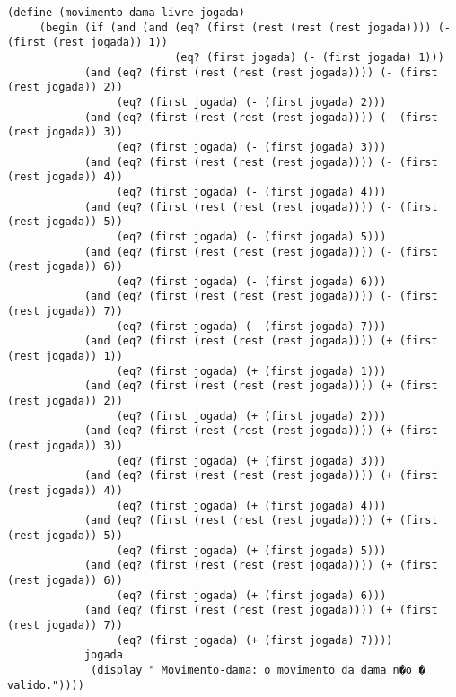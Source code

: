 \begin{lstlisting}[basicstyle=\ttfamily, caption="example"]
   (define (movimento-dama-livre jogada)
     (begin (if (and (and (eq? (first (rest (rest (rest jogada)))) (- (first (rest jogada)) 1))
                          (eq? (first jogada) (- (first jogada) 1)))
            (and (eq? (first (rest (rest (rest jogada)))) (- (first (rest jogada)) 2))
                 (eq? (first jogada) (- (first jogada) 2)))
            (and (eq? (first (rest (rest (rest jogada)))) (- (first (rest jogada)) 3))
                 (eq? (first jogada) (- (first jogada) 3)))
            (and (eq? (first (rest (rest (rest jogada)))) (- (first (rest jogada)) 4))
                 (eq? (first jogada) (- (first jogada) 4)))
            (and (eq? (first (rest (rest (rest jogada)))) (- (first (rest jogada)) 5))
                 (eq? (first jogada) (- (first jogada) 5)))
            (and (eq? (first (rest (rest (rest jogada)))) (- (first (rest jogada)) 6))
                 (eq? (first jogada) (- (first jogada) 6)))
            (and (eq? (first (rest (rest (rest jogada)))) (- (first (rest jogada)) 7))
                 (eq? (first jogada) (- (first jogada) 7)))
            (and (eq? (first (rest (rest (rest jogada)))) (+ (first (rest jogada)) 1))
                 (eq? (first jogada) (+ (first jogada) 1)))
            (and (eq? (first (rest (rest (rest jogada)))) (+ (first (rest jogada)) 2))
                 (eq? (first jogada) (+ (first jogada) 2)))
            (and (eq? (first (rest (rest (rest jogada)))) (+ (first (rest jogada)) 3))
                 (eq? (first jogada) (+ (first jogada) 3)))
            (and (eq? (first (rest (rest (rest jogada)))) (+ (first (rest jogada)) 4))
                 (eq? (first jogada) (+ (first jogada) 4)))
            (and (eq? (first (rest (rest (rest jogada)))) (+ (first (rest jogada)) 5))
                 (eq? (first jogada) (+ (first jogada) 5)))
            (and (eq? (first (rest (rest (rest jogada)))) (+ (first (rest jogada)) 6))
                 (eq? (first jogada) (+ (first jogada) 6)))
            (and (eq? (first (rest (rest (rest jogada)))) (+ (first (rest jogada)) 7))
                 (eq? (first jogada) (+ (first jogada) 7))))
            jogada
             (display " Movimento-dama: o movimento da dama n�o � valido."))))
\end{lstlisting}

